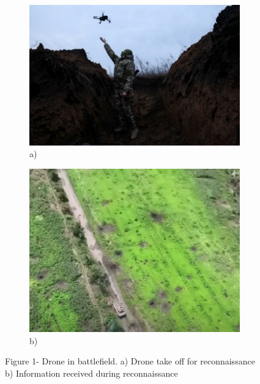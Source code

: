 \begin{figure}[H]
    \centering
    \begin{subfigure}[b]{0.45\textwidth}
        \centering
        \includegraphics[height=0.7\linewidth]{assets/10}
        \caption*{a)}
    \end{subfigure}\hfill
    \begin{subfigure}[b]{0.45\textwidth}
        \centering
        \includegraphics[height=0.7\linewidth]{assets/11}
        \caption*{b)}
    \end{subfigure}
	\caption*{Figure 1- Drone in battlefield. a) Drone take off for reconnaissance b) Information received during reconnaissance}
\end{figure}

